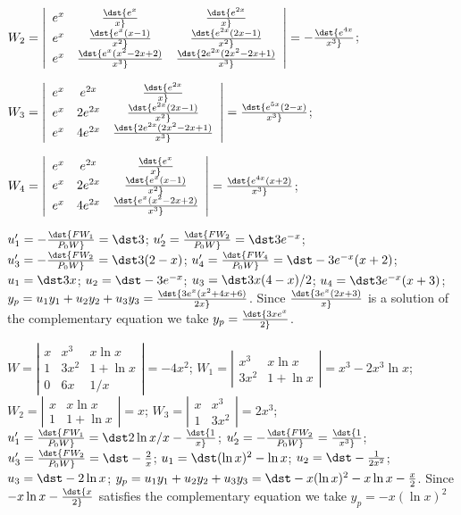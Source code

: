 \documentclass[dvips]{book}
\renewcommand{\exer}[1]{\par\medskip\;\noindent{\color{red}\bf #1.}}
\numberwithin{example}{section}
\numberwithin{equation}{section}
\numberwithin{theorem}{section}
\numberwithin{table}{section}
\numberwithin{figure}{section}
\begin{document}
$W_2=\left|\begin{array}{cccc}
e^x&\dst{e^x\over x}&\dst{e^{2x}\over x}\\
e^x&\dst{e^x(x-1)\over x^2}&\dst{e^{2x}(2x-1)\over x^2}\\
e^x&\dst{e^x(x^2-2x+2)\over x^3}&\dst{2e^{2x}(2x^2-2x+1)\over x^3}
\end{array}\right|=-\dst{e^{4x}\over x^3}$;

$W_3=\left|\begin{array}{cccc}
e^x&e^{2x}&\dst{e^{2x}\over x}\\
e^x&2e^{2x}&\dst{e^{2x}(2x-1)\over x^2}\\
e^x&4e^{2x}&\dst{2e^{2x}(2x^2-2x+1)\over x^3}
\end{array}\right|=\dst{e^{5x}(2-x)\over x^3}$;

$W_4=\left|\begin{array}{cccc}
e^x&e^{2x}&\dst{e^x\over x}\\
e^x&2e^{2x}&\dst{e^x(x-1)\over x^2}\\
e^x&4e^{2x}&\dst{e^x(x^2-2x+2)\over x^3}
\end{array}\right|=\dst{e^{4x}(x+2)\over x^3}$;

$u_1'=-\dst{FW_1\over P_0W}=\dst3$;
$u_2'=\dst{FW_2\over P_0W}=\dst3e^{-x}$;
$u_3'=-\dst{FW_2\over P_0W}=\dst3(2-x)$;
$u_4'=\dst{FW_4\over P_0W}=\dst-3e^{-x}(x+2)$;
$u_1=\dst 3x$;
$u_2=\dst-3e^{-x}$;
$u_3=\dst3x(4-x)/2$;
$u_4=\dst3e^{-x}(x+3)$;
$y_p=u_1y_1+u_2y_2+u_3y_3=\dst{3e^x(x^2+4x+6)\over 2x}$.
Since
$\dst{3e^x(2x+3)\over x}$ is a solution of the complementary
equation we take $y_p=\dst{3xe^x\over2}$.





\exer{9.4.22}
$W=\left|\begin{array}{cccc}
x&x^3&x\ln x\\1&3x^2&1+\ln x\\0&6x&1/x
\end{array}\right|=-4x^2$;
$W_1=\left|\begin{array}{cccc}
x^3&x\ln x\\3x^2&1+\ln x
\end{array}\right|=x^3-2x^3\ln x$;
$W_2=\left|\begin{array}{cccc}
x&x\ln x\\1&1+\ln x\end{array}\right|=x$;
$W_3=\left|\begin{array}{cccc}x&x^3\\1&3x^2
\end{array}\right|=2x^3$;
$u_1'=\dst{FW_1\over P_0W}=\dst2\ln x/x-\dst{1\over x}$;
$u_2'=-\dst{FW_2\over P_0W}=\dst{1\over x^3}$;
$u_3'=\dst{FW_2\over P_0W}=\dst-{2\over x}$;
$u_1=\dst(\ln x)^2-\ln x$;
$u_2=\dst-{1\over 2x^2}$;
$u_3=\dst-2\ln x$;
$y_p=u_1y_1+u_2y_2+u_3y_3=\dst-x(\ln x)^2-x\ln x-{x\over 2}$.
Since $-x\ln x-\dst{x\over 2}$ satisfies the complementary equation
we take $y_p=-x(\ln x)^2$
\end{document}
